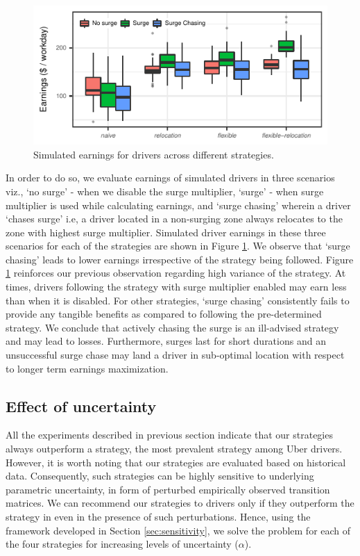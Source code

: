 \begin{figure}[H]
	\includegraphics{figures/simulated_earnings.pdf}
	\caption{Simulated earnings for drivers across different strategies.}
	\label{fig:simulated_earnings}
\end{figure}
In order to do so, we evaluate earnings of simulated drivers in three scenarios viz., `no surge' - when we disable the surge multiplier, `surge' - when surge multiplier is used while calculating earnings, and `surge chasing' wherein a driver `chases surge' i.e, a driver located in a non-surging zone always relocates to the zone with highest surge multiplier. Simulated driver earnings in these three scenarios for each of the strategies are shown in Figure {\ref{fig:simulated_earnings}}. We observe that `surge chasing' leads to lower earnings irrespective of the strategy being followed. Figure \ref{fig:simulated_earnings} reinforces our previous observation regarding high variance of the {\naive} strategy. At times, drivers following the {\naive} strategy with surge multiplier enabled may earn less than when it is disabled. For other strategies, `surge chasing' consistently fails to provide any tangible benefits as compared to following the pre-determined strategy. We conclude that actively chasing the surge is an ill-advised strategy and may lead to losses. Furthermore, surges last for short durations and an unsuccessful surge chase may land a driver in sub-optimal location with respect to longer term earnings maximization. 

\subsection{Effect of uncertainty} 

All the experiments described in previous section indicate that our strategies always outperform a {\naive} strategy, the most prevalent strategy among Uber drivers. However, it is worth noting that our strategies are evaluated based on historical data. Consequently, such strategies can be highly sensitive to underlying parametric uncertainty, in form of perturbed empirically observed transition matrices. We can recommend our strategies to drivers only if they outperform the {\naive} strategy in even in the presence of such perturbations. Hence, using the framework developed in Section \ref{sec:sensitivity}, we solve the {\robustproblem} problem for each of the four strategies for increasing levels of uncertainty ($\alpha$).

